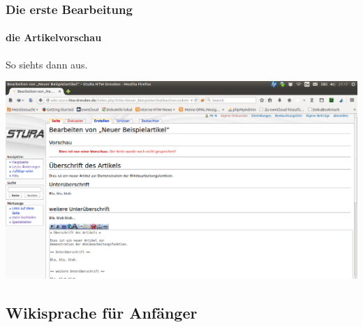 \documentclass{beamer}
\begin{document}
\begin{frame}
  \frametitle{Die erste Bearbeitung}
  \framesubtitle{die Artikelvorschau}

  So siehts dann aus.

  \begin{center}
    \includegraphics[width=1\linewidth]{Wikiartikel_Bearbeitungsvorschau}
  \end{center}

\end{frame}


\subsection{Wikisprache für Anfänger}
\end{document}
